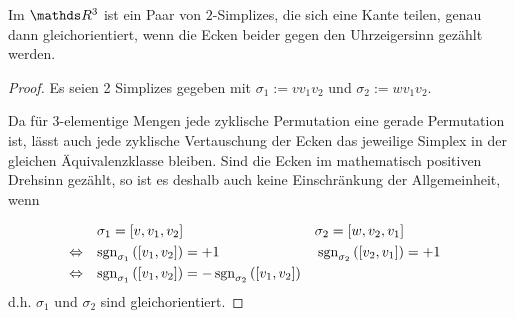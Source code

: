     \begin{folgerung}
      \label{folgOrientierungImR3}
      Im \( \R^{3} \) ist ein Paar von \( 2 \)-Simplizes, die sich eine Kante teilen, genau dann gleichorientiert, wenn die Ecken beider
      gegen den Uhrzeigersinn gezählt werden.
      \begin{proof}
        Es seien 2 Simplizes gegeben mit \( \sigma_{1} := v v_{1} v_{2} \) und \( \sigma_{2} := w v_{1} v_{2} \).
        \begin{minipage}{0.65\textwidth}
        Da für 3-elementige Mengen jede zyklische Permutation eine gerade Permutation ist, lässt auch jede zyklische Vertauschung der
        Ecken das jeweilige Simplex in der gleichen Äquivalenzklasse bleiben. 
        Sind die Ecken im mathematisch positiven Drehsinn gezählt, so ist es deshalb auch keine Einschränkung der Allgemeinheit, wenn
        \end{minipage}
        \hfill
        \begin{minipage}[c]{0.3\textwidth}  
        \end{minipage}
        \begin{align}
          &&\sigma_{1} = \left[ v, v_{1}, v_{2} \right] && \sigma_{2} = \left[ w, v_{2}, v_{1} \right] \\
          & \Leftrightarrow & \mathop{\mathrm{sgn}}\nolimits_{\sigma_{1}}\left( \left[ v_{1}, v_{2} \right] \right) &= +1
                            & \mathop{\mathrm{sgn}}\nolimits_{\sigma_{2}}\left( \left[ v_{2}, v_{1} \right] \right) &= +1 \\
          & \Leftrightarrow & \mathop{\mathrm{sgn}}\nolimits_{\sigma_{1}}\left( \left[ v_{1}, v_{2} \right] \right)
                                          &= -\mathop{\mathrm{sgn}}\nolimits_{\sigma_{2}}\left( \left[ v_{1}, v_{2} \right]\right)
        \end{align}
        d.h. \( \sigma_{1} \) und \( \sigma_{2} \) sind gleichorientiert.
      \end{proof}
    \end{folgerung}

